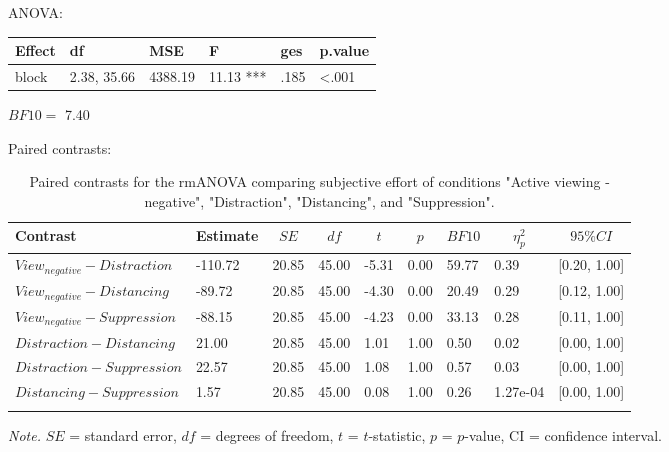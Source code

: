 \documentclass[
  man,floatsintext]{apa6}
\begin{document}
ANOVA:

\begin{tabular}{l|l|l|l|l|l}
\hline
Effect & df & MSE & F & ges & p.value\\
\hline
block & 2.38, 35.66 & 4388.19 & 11.13 *** & .185 & <.001\\
\hline
\end{tabular}

\(BF10=\) 7.40

Paired contrasts:

\begin{table}[H]

\begin{center}
\begin{threeparttable}

\caption{\label{tab:unnamed-chunk-10}Paired contrasts for the rmANOVA comparing subjective effort of conditions "Active viewing - negative", "Distraction", "Distancing", and "Suppression".}

\begin{tabular}{lllllllll}
\toprule
Contrast & \multicolumn{1}{c}{Estimate} & \multicolumn{1}{c}{$SE$} & \multicolumn{1}{c}{$df$} & \multicolumn{1}{c}{$t$} & \multicolumn{1}{c}{$p$} & \multicolumn{1}{c}{$BF10$} & \multicolumn{1}{c}{$\eta_{p}^{2}$} & \multicolumn{1}{c}{$95\% CI$}\\
\midrule
$View_{negative} - Distraction$ & -110.72 & 20.85 & 45.00 & -5.31 & 0.00 & 59.77 & 0.39 & {}[0.20, 1.00]\\
$View_{negative} - Distancing$ & -89.72 & 20.85 & 45.00 & -4.30 & 0.00 & 20.49 & 0.29 & {}[0.12, 1.00]\\
$View_{negative} - Suppression$ & -88.15 & 20.85 & 45.00 & -4.23 & 0.00 & 33.13 & 0.28 & {}[0.11, 1.00]\\
$Distraction - Distancing$ & 21.00 & 20.85 & 45.00 & 1.01 & 1.00 & 0.50 & 0.02 & {}[0.00, 1.00]\\
$Distraction - Suppression$ & 22.57 & 20.85 & 45.00 & 1.08 & 1.00 & 0.57 & 0.03 & {}[0.00, 1.00]\\
$Distancing - Suppression$ & 1.57 & 20.85 & 45.00 & 0.08 & 1.00 & 0.26 & 1.27e-04 & {}[0.00, 1.00]\\
\bottomrule
\addlinespace
\end{tabular}

\begin{tablenotes}[para]
\normalsize{\textit{Note.} $SE$ = standard error, $df$ = degrees of freedom, $t$ = $t$-statistic, $p$ = $p$-value, CI = confidence interval.}
\end{tablenotes}

\end{threeparttable}
\end{center}

\end{table}
\end{document}
